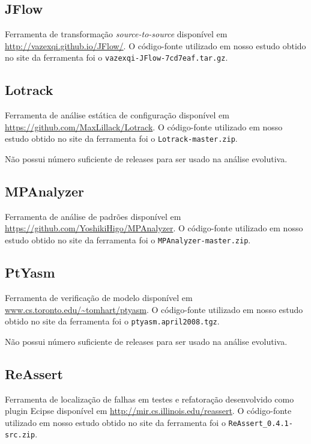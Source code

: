 \subsection{JFlow}

Ferramenta de transformação {\it source-to-source} disponível em
\url{http://vazexqi.github.io/JFlow/}. O código-fonte
utilizado em nosso estudo obtido no site da ferramenta foi o
\texttt{vazexqi-JFlow-7cd7eaf.tar.gz}.

\subsection{Lotrack}

Ferramenta de análise estática de configuração disponível em
\url{https://github.com/MaxLillack/Lotrack}. O código-fonte utilizado em nosso
estudo obtido no site da ferramenta foi o \texttt{Lotrack-master.zip}.

Não possui número suficiente de releases para ser usado na análise evolutiva.

\subsection{MPAnalyzer}

Ferramenta de análise de padrões disponível em
\url{https://github.com/YoshikiHigo/MPAnalyzer}. O código-fonte utilizado em
nosso estudo obtido no site da ferramenta foi o \texttt{MPAnalyzer-master.zip}.

\subsection{PtYasm}

Ferramenta de verificação de modelo disponível em
\url{www.cs.toronto.edu/~tomhart/ptyasm}. O código-fonte
utilizado em nosso estudo obtido no site da ferramenta foi o
\texttt{ptyasm.april2008.tgz}.

Não possui número suficiente de releases para ser usado na análise evolutiva.

\subsection{ReAssert}

Ferramenta de localização de falhas em testes e refatoração
desenvolvido como plugin Ecipse disponível em
\url{http://mir.cs.illinois.edu/reassert}. O código-fonte utilizado em nosso
estudo obtido no site da ferramenta foi o \texttt{ReAssert\_0.4.1-src.zip}.

